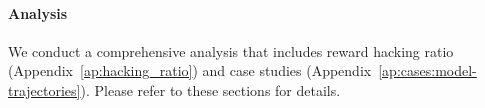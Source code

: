 \vspace{-10pt}
\paragraph{Analysis} We conduct a comprehensive analysis that includes reward hacking ratio (Appendix~\ref{ap:hacking_ratio}) and case studies (Appendix~\ref{ap:cases:model-trajectories}). Please refer to these sections for details.




